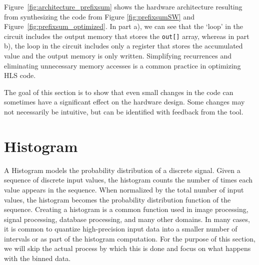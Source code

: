 Figure~\ref{fig:architecture_prefixsum} shows the hardware architecture resulting from synthesizing the code from Figure \ref{fig:prefixsumSW} and Figure~\ref{fig:prefixsum_optimized}.   In part a), we can see that the `loop' in the circuit includes the output memory that stores the \lstinline{out[]} array, whereas in part b), the loop in the circuit includes only a register that stores the accumulated value and the output memory is only written.  Simplifying recurrences and eliminating unnecessary memory accesses is a common practice in optimizing HLS code.



The goal of this section is to show that even small changes in the code can sometimes have a significant effect on the hardware design. Some changes may not necessarily be intuitive, but can be identified with feedback from the tool.

\section{Histogram}
\label{sec:histogram}

A Histogram models the probability distribution of a discrete signal. Given a sequence of discrete input values, the histogram counts the number of times each value appears in the sequence.  When normalized by the total number of input values, the histogram becomes the probability distribution function of the sequence.  Creating a histogram is a common function used in image processing, signal processing, database processing, and many other domains.  In many cases, it is common to quantize high-precision input data into a smaller number of intervals or  as part of the histogram computation.  For the purpose of this section, we will skip the actual process by which this is done and focus on what happens with the binned data.

